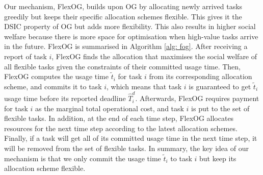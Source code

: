 \documentclass[11pt]{phdthesis}
\begin{document}
Our mechanism, FlexOG, builds upon OG by allocating newly arrived tasks greedily but keeps their specific allocation schemes flexible. This gives it the DSIC property of OG but adds more flexibility. This also results in higher social welfare because there is more space for optimisation when high-value tasks arrive in the future. FlexOG is summarised in Algorithm \ref{alg: fog}. After receiving a report of task $ i $, FlexOG finds the allocation that maximises the social welfare of all flexible tasks given the constraints of their committed usage time. Then, FlexOG computes the usage time $ \tilde{t}_i $ for task $ i $ from its corresponding allocation scheme, and commits it to task $ i $, which means that task $ i $ is guaranteed to get $ \tilde{t}_i $ usage time before its reported deadline $ \hat{T}_i^d $. Afterwards, FlexOG requires payment for task $ i $ as the marginal total operational cost, and task $ i $ is put to the set of flexible tasks. In addition, at the end of each time step, FlexOG allocates resources for the next time step according to the latest allocation schemes. Finally, if a task will get all of its committed usage time in the next time step, it will be removed from the set of flexible tasks. In summary, the key idea of our mechanism is that we only commit the usage time $\tilde{t}_{i}$ to task $ i $ but keep its allocation scheme flexible.

\end{document}
